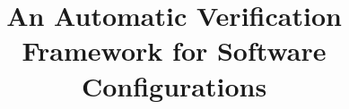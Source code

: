 \documentclass[letterpaper,twocolumn,10pt]{article}
\begin{document}
\setlength{\pdfpageheight}{\paperheight}
\setlength{\pdfpagewidth}{\paperwidth}





\title{An Automatic Verification Framework for Software Configurations}

\author{~}

\maketitle





%



%










\end{document}
